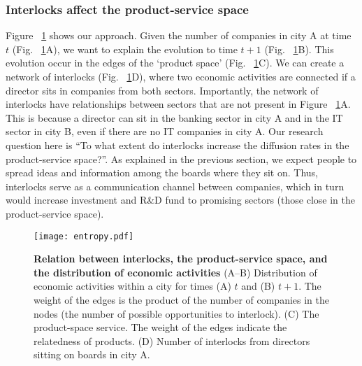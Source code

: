 \subsubsection{Interlocks affect the product-service space}
Figure ~\ref{fig:entropy} shows our approach. 
Given the number of companies in city A at time $t$ (Fig. ~\ref{fig:entropy}A), 
we want to explain the evolution to time $t+1$ (Fig. ~\ref{fig:entropy}B).
This evolution occur in the edges of the `product space' (Fig. ~\ref{fig:entropy}C).
We can create a network of interlocks (Fig. ~\ref{fig:entropy}D),
where two economic activities are connected if a director sits in companies from both sectors.
Importantly, the network of interlocks have relationships between sectors that are not present in Figure ~\ref{fig:entropy}A. 
This is because a director can sit in the banking sector in city A and in the IT sector in city B, even if there are no IT companies in city A.
Our research question here is ``To what extent do interlocks increase the diffusion rates in the product-service space?''.
As explained in the previous section, 
we expect people to spread ideas and information among the boards where they sit on.
Thus, interlocks serve as a communication channel between companies, 
which in turn would increase investment and R\&D fund to promising sectors (those close in the product-service space).

\begin{figure}
\begin{center}
\texttt{[image: entropy.pdf]}
\caption{\textbf{Relation between interlocks, the product-service space, and the distribution of economic activities} (A--B) Distribution of economic activities within a city for times (A) $t$ and (B) $t+1$. The weight of the edges is the product of the number of companies in the nodes (the number of possible opportunities to interlock). (C) The product-space service. The weight of the edges indicate the relatedness of products. (D) Number of interlocks from directors sitting on boards in city A.}
\label{fig:entropy}
\end{center}
\end{figure}

